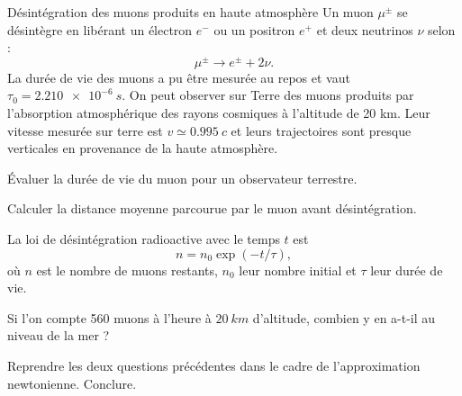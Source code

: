 \begin{exo}[PC][1][TD]{Désintégration des muons produits en haute atmosphère}
Un muon $\mu^{ \pm}$ se désintègre en libérant un électron $e^-$ ou un positron $e^+$ et deux neutrinos $\nu$  selon :
$$
\mu^{ \pm} \rightarrow e^{ \pm}+2 \nu.
$$
La durée de vie des muons a pu être mesurée au repos et vaut $\tau_0=\SI{2.210e-6}{s}$.
On peut observer sur Terre des muons produits par l'absorption atmosphérique des rayons cosmiques à l'altitude de 20 km. Leur vitesse mesurée sur terre est $v \simeq \SI{0,995}{c}$ et leurs trajectoires sont presque verticales en provenance de la haute atmosphère.
\begin{quest}
  \item Évaluer la durée de vie du muon pour un observateur terrestre.
  \item Calculer la distance moyenne parcourue par le muon avant désintégration.
\end{quest}
La loi de désintégration radioactive avec le temps $t$ est
\begin{equation}
  n=n_0 \exp (-t / \tau),
\end{equation}
où $n$ est le nombre de muons restants, $n_0$ leur nombre initial et $\tau$ leur durée de vie. 
  \begin{quest}
  \item Si l'on compte 560 muons à l'heure à $\SI{20}{km}$ d’altitude, combien y en a-t-il au niveau de la mer ?
\item Reprendre les deux questions précédentes dans le cadre de l'approximation newtonienne. Conclure.
\end{quest}
\end{exo}

